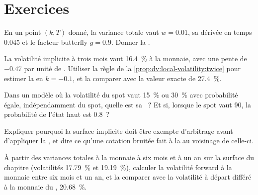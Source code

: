 \section{Exercices}

\begin{exercise}[$\star$]\label{exo:dv:local-volatility:1}
En un point $(k,T)$ donné, la variance totale vaut $w=0.01$, sa dérivée en temps 0.045 et le facteur butterfly $g=0.9$.
Donner la .
\end{exercise}

\begin{exercise}[$\star$]\label{exo:dv:local-volatility:2}
La volatilité implicite à trois mois vaut 16.4~\% à la monnaie, avec une pente de $-0.47$ par unité de . Utiliser
la règle de la \cref{prop:dv:local-volatility:twice} pour estimer la  en $k=-0.1$, et la comparer
avec la valeur exacte de 27.4~\%.
\end{exercise}

\begin{exercise}[$\star$]\label{exo:dv:local-volatility:3}
Dans un modèle où la volatilité du spot vaut 15~\% ou 30~\% avec probabilité égale, indépendamment du spot, quelle est
sa ~? Et si, lorsque le spot vaut 90, la probabilité de l'état haut est 0.8~?
\end{exercise}

\begin{exercise}[$\star\star$]\label{exo:dv:local-volatility:4}
Expliquer pourquoi la surface implicite doit être exempte d'arbitrage avant d'appliquer la , et dire
ce qu'une cotation bruitée fait à la  au voisinage de celle-ci.
\end{exercise}

\begin{exercise}[$\star\star$]\label{exo:dv:local-volatility:5}
À partir des variances totales à la monnaie à six mois et à un an sur la surface du chapitre (volatilités 17.79~\% et
19.19~\%), calculer la volatilité forward à la monnaie entre six mois et un an, et la comparer avec la
volatilité à départ différé à la monnaie du , 20.68~\%.
\end{exercise}

